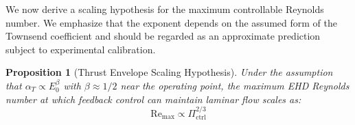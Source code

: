 \documentclass[12pt,twocolumn]{article}
\newtheorem{proposition}[theorem]{Proposition}
\newcommand{\Pctrl}{\Pi_{\mathrm{ctrl}}}
\begin{document}
We now derive a scaling hypothesis for the maximum controllable
Reynolds number. We emphasize that the exponent depends on the
assumed form of the Townsend coefficient and should be regarded as
an approximate prediction subject to experimental calibration.

\begin{proposition}[Thrust Envelope Scaling Hypothesis]
\label{prop:scaling}
Under the assumption that $\alpha_T \propto E_0^{\beta}$ with
$\beta \approx 1/2$ near the operating point, the maximum EHD
Reynolds number at which feedback control can maintain laminar
flow scales as:
\begin{equation}
\boxed{
  \mathrm{Re}_{\max} \propto \Pctrl^{2/3}
}
\label{eq:scaling_law}
\end{equation}
\end{proposition}
\end{document}
